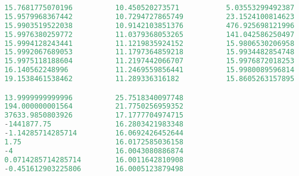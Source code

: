 \begin{lstlisting}[language = MATLAB]
%%%% Problem 3, Convergence Rate
  15.7681775070196          10.450520273571           5.03553299492387
  15.9579968367442          10.7294727865749          23.1524100814623
  15.9903519522038          10.9142103851376          476.925698121996
  15.9976380259772          11.0379368053265          141.042586250497
  15.9994128243441          11.1219835924152          15.9806530206958
  15.9992067689053          11.1797364859218          15.9934482854748
  15.9975118188604          11.2197442066707          15.9976872018253
  16.140562248996           11.2469559856441          15.9980089596814
  19.1538461538462          11.289336316182           15.8605263157895

  13.9999999999996          25.7518340097748
  194.000000001564          21.7750256959352
  37633.9850803926          17.1777704974715
  -1441877.75               16.2803421983348
  -1.14285714285714         16.0692426452644
  1.75                      16.0172585036158
  -4                        16.0043080886874
  0.0714285714285714        16.0011642810908
  -0.451612903225806        16.0005123879498
\end{lstlisting}


